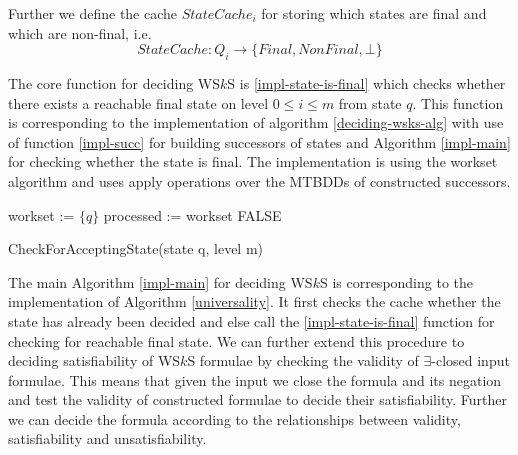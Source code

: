  Further we define the cache $\mathit{StateCache}_i$ for storing which states
 are final and which are non-final, i.e.
 \begin{equation}
  \mathit{StateCache} : Q_i \rightarrow \{Final, NonFinal, \bot\}
 \end{equation}
 
 The core function for deciding WS$k$S is \ref{impl-state-is-final} which checks
 whether there exists a reachable final state on level $0 \leq i \leq m$ from
 state $q$. This function is corresponding to the implementation of algorithm
 \ref{deciding-wsks-alg} with use of function \ref{impl-succ} for building successors of
 states and Algorithm \ref{impl-main} for checking whether the state is final.
 The implementation is using the workset algorithm and uses apply operations
 over the MTBDDs of constructed successors.
 
\begin{function}[h!]
		\BlankLine
		\nl workset := $\{q\}$\;
		\nl processed := workset\;
		\nl {}
			\Return \textsc{FALSE}\;
		\caption{CheckForAcceptingState(state q, level m)}\label{impl-state-is-final}
\end{function}
 
 The main Algorithm \ref{impl-main} for deciding WS$k$S is corresponding to the
 implementation of Algorithm \ref{universality}. It first checks the cache
 whether the state has already been decided and else call the
 \ref{impl-state-is-final} function for checking for reachable final state. We
 can further extend this procedure to deciding satisfiability of WS$k$S
 formulae by checking the validity of $\exists$-closed input formulae. This
 means that given the input we close the formula and its negation and test the
 validity of constructed formulae to decide their satisfiability. Further we can
 decide the formula according to the relationships between validity,
 satisfiability and unsatisfiability.
 
